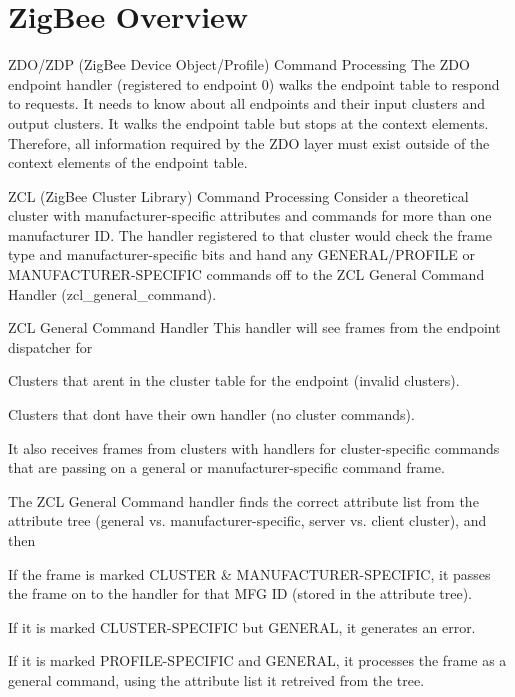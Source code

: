 \hypertarget{index_zigbee_overview}{}\section{Zig\+Bee Overview}\label{index_zigbee_overview}
\begin{DoxyParagraph}{Z\+D\+O/\+Z\+DP (Zig\+Bee Device Object/\+Profile) Command Processing}
The Z\+DO endpoint handler (registered to endpoint 0) walks the endpoint table to respond to requests. It needs to know about all endpoints and their input clusters and output clusters. It walks the endpoint table but stops at the context elements. Therefore, all information required by the Z\+DO layer must exist outside of the context elements of the endpoint table.
\end{DoxyParagraph}
\begin{DoxyParagraph}{Z\+CL (Zig\+Bee Cluster Library) Command Processing}
Consider a theoretical cluster with manufacturer-\/specific attributes and commands for more than one manufacturer ID. The handler registered to that cluster would check the frame type and manufacturer-\/specific bits and hand any G\+E\+N\+E\+R\+A\+L/\+P\+R\+O\+F\+I\+LE or M\+A\+N\+U\+F\+A\+C\+T\+U\+R\+E\+R-\/\+S\+P\+E\+C\+I\+F\+IC commands off to the Z\+CL General Command Handler (zcl\+\_\+general\+\_\+command).
\end{DoxyParagraph}
\begin{DoxyParagraph}{Z\+CL General Command Handler}
This handler will see frames from the endpoint dispatcher for
\begin{DoxyItemize}
\item Clusters that aren\textquotesingle{}t in the cluster table for the endpoint (invalid clusters).
\item Clusters that don\textquotesingle{}t have their own handler (no cluster commands).
\end{DoxyItemize}
\end{DoxyParagraph}
It also receives frames from clusters with handlers for cluster-\/specific commands that are passing on a general or manufacturer-\/specific command frame.

The Z\+CL General Command handler finds the correct attribute list from the attribute tree (general vs. manufacturer-\/specific, server vs. client cluster), and then
\begin{DoxyItemize}
\item If the frame is marked C\+L\+U\+S\+T\+ER \& M\+A\+N\+U\+F\+A\+C\+T\+U\+R\+E\+R-\/\+S\+P\+E\+C\+I\+F\+IC, it passes the frame on to the handler for that M\+FG ID (stored in the attribute tree).
\item If it is marked C\+L\+U\+S\+T\+E\+R-\/\+S\+P\+E\+C\+I\+F\+IC but G\+E\+N\+E\+R\+AL, it generates an error.
\item If it is marked P\+R\+O\+F\+I\+L\+E-\/\+S\+P\+E\+C\+I\+F\+IC and G\+E\+N\+E\+R\+AL, it processes the frame as a general command, using the attribute list it retreived from the tree.
\end{DoxyItemize}

